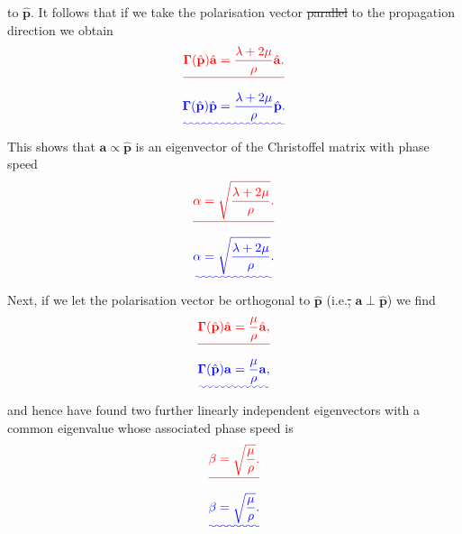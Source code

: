 \documentclass [a4paper,12pt]{paper}
\providecommand{\DIFadd}[1]{{\protect\color{blue}\uwave{#1}}} %
\providecommand{\DIFdel}[1]{{\protect\color{red}\sout{#1}}}                      %
\providecommand{\DIFaddbegin}{} %
\providecommand{\DIFaddend}{} %
\providecommand{\DIFdelbegin}{} %
\providecommand{\DIFdelend}{} %
\begin{document}
 to $\hat{\mathbf{p}}$. It follows that if we take the polarisation vector \DIFdelbegin \DIFdel{parallel }\DIFdelend \DIFaddbegin \DIFadd{equal }\DIFaddend to the propagation direction we obtain
\DIFdelbegin \begin{displaymath}
\DIFdel{\bm{\Gamma}(\hat{\mathbf{p}})\hat{\mathbf{a}}=\frac{\lambda+2\mu}{\rho}\hat{\mathbf{a}}.
}\end{displaymath}%
\DIFdelend \DIFaddbegin \begin{equation}
\DIFadd{\bm{\Gamma}(\hat{\mathbf{p}})\hat{\mathbf{p}}=\frac{\lambda+2\mu}{\rho}\hat{\mathbf{p}}.
\label{eq:24}
}\end{equation}\DIFaddend 
This shows that $\mathbf{a}\propto \hat{\mathbf{p}}$ is an eigenvector of the Christoffel matrix with phase speed
\DIFdelbegin \begin{displaymath}
\DIFdel{\alpha=\sqrt{\frac{\lambda+2\mu}{\rho}}.
}\end{displaymath}%
\DIFdelend \DIFaddbegin \begin{equation}
\DIFadd{\alpha=\sqrt{\frac{\lambda+2\mu}{\rho}}.
\label{eq:25}
}\end{equation}\DIFaddend 
Next, if we let the polarisation vector be orthogonal to $\hat{\mathbf{p}}$ (i.e.\DIFdelbegin \DIFdel{, }\DIFdelend \DIFaddbegin \DIFadd{\ }\DIFaddend $\mathbf{a}\perp \hat{\mathbf{p}}$) we find
\DIFdelbegin \begin{displaymath}
\DIFdel{\bm{\Gamma}(\hat{\mathbf{p}})\hat{\mathbf{a}}=\frac{\mu}{\rho}\hat{\mathbf{a}}, 
}\end{displaymath}%
\DIFdelend \DIFaddbegin \begin{equation}
\DIFadd{\bm{\Gamma}(\hat{\mathbf{p}})\mathbf{a}=\frac{\mu}{\rho}\mathbf{a}, 
\label{eq:26}
}\end{equation}\DIFaddend 
and hence have found two further linearly independent eigenvectors with a common eigenvalue whose associated phase speed is
\DIFdelbegin \begin{displaymath}
\DIFdel{\beta=\sqrt{\frac{\mu}{\rho}}.
}\end{displaymath}%
\DIFdelend \DIFaddbegin \begin{equation}
\DIFadd{\beta=\sqrt{\frac{\mu}{\rho}}.
\label{eq:27}
}\end{equation}\DIFaddend 
\end{document}
